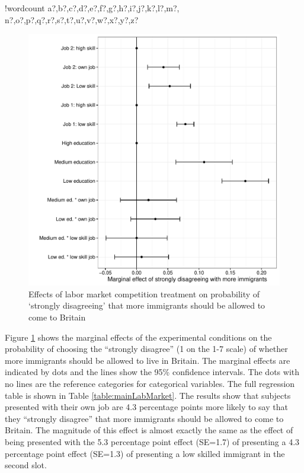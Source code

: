 \documentclass{article}\usepackage[]{graphicx}\usepackage[]{color}
\makeatletter
\def\maxwidth{ %
  \ifdim\Gin@nat@width>\linewidth
    \linewidth
  \else
    \Gin@nat@width
  \fi
}
\newcounter{words}
\newenvironment{counted}{%
\setcounter{words}{0}
\SearchList!{wordcount}{\stepcounter{words}}
{a?,b?,c?,d?,e?,f?,g?,h?,i?,j?,k?,l?,m?,
n?,o?,p?,q?,r?,s?,t?,u?,v?,w?,x?,y?,z?}
\UndoBoundary{'}
\SearchOrder{p;}}{%
\StopSearching}
\makeatother
\begin{document}
\begin{counted}
\begin{figure}
\includegraphics[width=\maxwidth]{figure/mainLabMarketMFX-1} \caption[Effects of labor market competition treatment on probability of `strongly disagreeing' that more immigrants should be allowed to come to Britain]{Effects of labor market competition treatment on probability of `strongly disagreeing' that more immigrants should be allowed to come to Britain}\label{fig:mainLabMarketMFX}
\end{figure}




Figure \ref{fig:mainLabMarketMFX} shows the marginal effects of the experimental conditions on the probability of choosing the ``strongly disagree'' (1 on the 1-7 scale) of whether more immigrants should be allowed to live in Britain. The marginal effects are indicated by dots and the lines show the 95\% confidence intervals. The dots with no lines are the reference categories for categorical variables. The full regression table is shown in Table \ref{table:mainLabMarket}. The results show that subjects presented with their own job are 4.3 percentage points more likely to say that they ``strongly disagree'' that more immigrants should be allowed to come to Britain. The magnitude of this effect is almost exactly the same as the effect of being presented with the 5.3 percentage point effect (SE=1.7) of presenting a 4.3 percentage point effect (SE=1.3) of presenting a low skilled immigrant in the second slot.


\end{counted}
\end{document}
